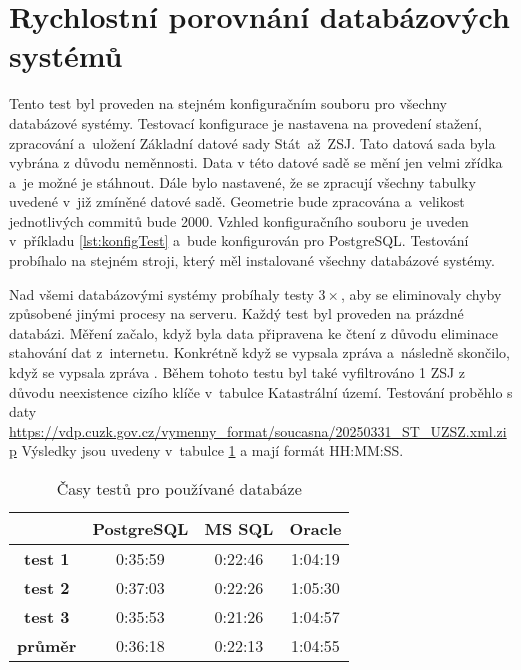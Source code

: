 \section{Rychlostní porovnání databázových systémů}
Tento test byl proveden na stejném konfiguračním souboru pro všechny databázové systémy.
Testovací konfigurace je nastavena na provedení stažení, zpracování a~uložení Základní datové sady Stát~až~ZSJ.
Tato datová sada byla vybrána z důvodu neměnnosti. 
Data v této datové sadě se mění jen velmi zřídka a~je možné je stáhnout.
Dále bylo nastavené, že se zpracují všechny tabulky uvedené v~již zmíněné datové sadě.
Geometrie bude zpracována a~velikost jednotlivých commitů bude 2000.
Vzhled konfiguračního souboru je uveden v~příkladu \ref{lst:konfigTest} a~bude konfigurován pro PostgreSQL.
Testování probíhalo na stejném stroji, který měl instalované všechny databázové systémy.

Nad všemi databázovými systémy probíhaly testy \(3\times\), aby se eliminovaly chyby způsobené jinými procesy na serveru.
Každý test byl proveden na prázdné databázi.
Měření začalo, když byla data připravena ke čtení z důvodu eliminace stahování dat z~internetu.
Konkrétně když se vypsala zpráva  a~následně skončilo, když se 
vypsala zpráva .
Během tohoto testu byl také vyfiltrováno 1 ZSJ z důvodu neexistence cizího klíče v~tabulce Katastrální území.
Testování proběhlo s daty \url{https://vdp.cuzk.gov.cz/vymenny_format/soucasna/20250331_ST_UZSZ.xml.zip}
Výsledky jsou uvedeny v~tabulce \ref{tab:test1} a mají formát HH:MM:SS.

\begin{table}[!h]
  \centering
  \caption{Časy testů pro používané databáze}
  \label{tab:test1}
  \begin{tabular}{|c|c|c|c|}
  \hline
                  & \textbf{PostgreSQL} & \textbf{MS SQL} & \textbf{Oracle} \\ \hline
  \textbf{test 1} & 0:35:59             & 0:22:46         & 1:04:19         \\ \hline
  \textbf{test 2} & 0:37:03             & 0:22:26         & 1:05:30         \\ \hline
  \textbf{test 3} & 0:35:53             & 0:21:26         & 1:04:57         \\ \hline
  \textbf{průměr} & 0:36:18             & 0:22:13         & 1:04:55         \\ \hline
  \end{tabular}
\end{table}

